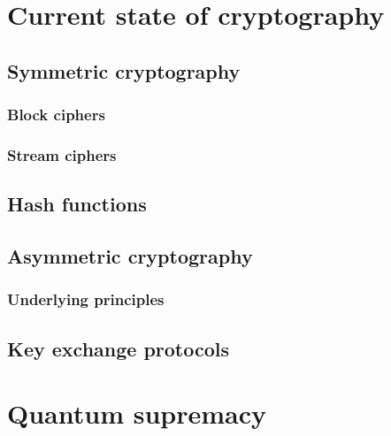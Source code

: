 \chapter{Current state of cryptography}
\label{ch:state_of_crypto}


\section{Symmetric cryptography}
\label{sec:symmetric_enc}


\subsection{Block ciphers}
\label{subsec:block_ciphers}


\subsection{Stream ciphers}
\label{subsec:stream_ciphers}


\section{Hash functions}
\label{sec:hash_functions}


\section{Asymmetric cryptography}
\label{sec:asymmetric_enc}


\subsection{Underlying principles}
\label{subsec:underlying_principles}


\section{Key exchange protocols}
\label{sec:key_agreement}


\chapter{Quantum supremacy}
\label{ch:quantum_supr}



